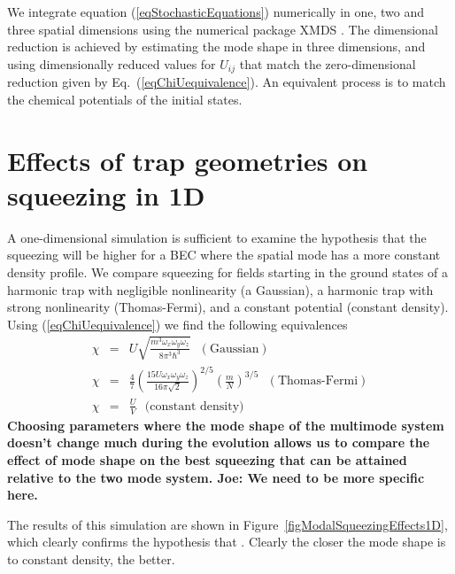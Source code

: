 \documentclass{iopart}
\begin{document}
We integrate equation (\ref{eqStochasticEquations}) numerically in one, two and three spatial dimensions using the numerical package XMDS \cite{Dennis2012}.  The dimensional reduction is achieved by estimating the mode shape in three dimensions, and using dimensionally reduced values for $U_{ij}$ that match the zero-dimensional reduction given by Eq.~(\ref{eqChiUequivalence}).  An equivalent process is to match the chemical potentials of the initial states.  

\section{Effects of trap geometries on squeezing in 1D}

A one-dimensional simulation is sufficient to examine the hypothesis that the squeezing will be higher for a BEC where the spatial mode has a more constant density profile.  We compare squeezing for fields starting in the ground states of a harmonic trap with negligible nonlinearity (a Gaussian), a harmonic trap with strong nonlinearity (Thomas-Fermi), and a constant potential (constant density). Using (\ref{eqChiUequivalence}) we find the following equivalences
\begin{eqnarray}
\chi &=& U \sqrt{\frac{m^3 \omega_x \omega_y \omega_z}{8 \pi^3 \hbar^3}} \,\,\,\, ({\textrm{Gaussian}}) \\
%
\chi &=& \frac{4}{7} \left( \frac{15 U \omega_x \omega_y \omega_z}{16 \pi \sqrt{2}} \right)^{2/5} \left( \frac{m}{N} \right)^{3/5} \,\,\,\, ({\textrm{Thomas-Fermi}}) \\
%
\chi &=& \frac{U}{V} \,\,\,\, {\textrm{(constant density)}}
\end{eqnarray}
\textbf{Choosing parameters where the mode shape of the multimode system doesn't change much during the evolution allows us to compare the effect of mode shape on the best squeezing that can be attained relative to the two mode system.  Joe: We need to be more specific here.} 

The results of this simulation are shown in Figure~\ref{figModalSqueezingEffects1D}, which clearly confirms the hypothesis that . Clearly the closer the mode shape is to constant density, the better.
\end{document}
